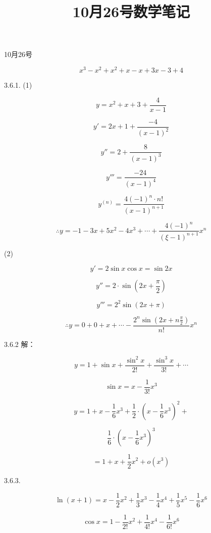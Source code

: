 \documentclass[UTF8,fontset=windows]{ctexart}
\title{10月26号数学笔记}
\begin{document}
\maketitle
10月26号

\[
x^3 - x^2 + x^2 + x - x + 3x - 3 + 4
\]

3.6.1. (1)

\[
y = x^2 + x + 3 + \frac{4}{x-1}
\]

\[
y' = 2x + 1 + \frac{-4}{(x-1)^2}
\]

\[
y'' = 2 + \frac{8}{(x-1)^3}
\]

\[
y''' = \frac{-24}{(x-1)^4}
\]

\[
y^{(n)} = \frac{4(-1)^n \cdot n!}{(x-1)^{n+1}}
\]

\[
\therefore y = -1 - 3x + 5x^2 - 4x^3 + \cdots + \frac{4(-1)^n}{(\xi-1)^{n+1}}x^n
\]

(2)

\[
y' = 2\sin x\cos x = \sin 2x
\]

\[
y'' = 2 \cdot \sin\left(2x + \frac{\pi}{2}\right)
\]

\[
y''' = 2^2 \sin(2x + \pi)
\]

\[
\therefore y = 0 + 0 + x + \cdots - \frac{2^n \sin\left(2x + n\frac{\pi}{2}\right)}{n!}x^n
\]

3.6.2 解：

\[
y = 1 + \sin x + \frac{\sin^2 x}{2!} + \frac{\sin^3 x}{3!} + \cdots
\]

\[
\sin x = x - \frac{1}{3!}x^3
\]

\[
y = 1 + x - \frac{1}{6}x^3 + \frac{1}{2}\cdot \left(x - \frac{1}{6}x^3\right)^2 +
\]

\[
\frac{1}{6}\cdot \left(x - \frac{1}{6}x^3\right)^3
\]

\[
= 1 + x + \frac{1}{2}x^2 + o(x^3)
\]

3.6.3.

\[
\ln(x+1) = x - \frac{1}{2}x^2 + \frac{1}{3}x^3 - \frac{1}{4}x^4 + \frac{1}{5}x^5 - \frac{1}{6}x^6
\]

\[
\cos x = 1 - \frac{1}{2!}x^2 + \frac{1}{4!}x^4 - \frac{1}{6!}x^6
\]
\end{document}

